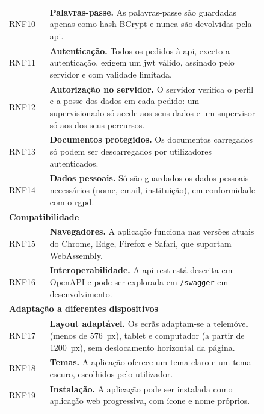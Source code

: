 \begin{longtable}{lp{0.84\linewidth}}
RNF10 & \textbf{Palavras-passe.} As palavras-passe são guardadas apenas como hash BCrypt e nunca são devolvidas pela \gls{api}. \\
RNF11 & \textbf{Autenticação.} Todos os pedidos à \gls{api}, exceto a autenticação, exigem um \gls{jwt} válido, assinado pelo servidor e com validade limitada. \\
RNF12 & \textbf{Autorização no servidor.} O servidor verifica o perfil e a posse dos dados em cada pedido: um supervisionado só acede aos seus dados e um supervisor só aos dos seus percursos. \\
RNF13 & \textbf{Documentos protegidos.} Os documentos carregados só podem ser descarregados por utilizadores autenticados. \\
RNF14 & \textbf{Dados pessoais.} Só são guardados os dados pessoais necessários (nome, email, instituição), em conformidade com o \gls{rgpd}. \\
\midrule
\multicolumn{2}{l}{\textbf{Compatibilidade}} \\
RNF15 & \textbf{Navegadores.} A aplicação funciona nas versões atuais do Chrome, Edge, Firefox e Safari, que suportam WebAssembly. \\
RNF16 & \textbf{Interoperabilidade.} A \gls{api} \gls{rest} está descrita em OpenAPI e pode ser explorada em \texttt{/swagger} em desenvolvimento. \\
\midrule
\multicolumn{2}{l}{\textbf{Adaptação a diferentes dispositivos}} \\
RNF17 & \textbf{Layout adaptável.} Os ecrãs adaptam-se a telemóvel (menos de 576~px), tablet e computador (a partir de 1200~px), sem deslocamento horizontal da página. \\
RNF18 & \textbf{Temas.} A aplicação oferece um tema claro e um tema escuro, escolhidos pelo utilizador. \\
RNF19 & \textbf{Instalação.} A aplicação pode ser instalada como aplicação web progressiva, com ícone e nome próprios. \\
\end{longtable}
\endgroup
